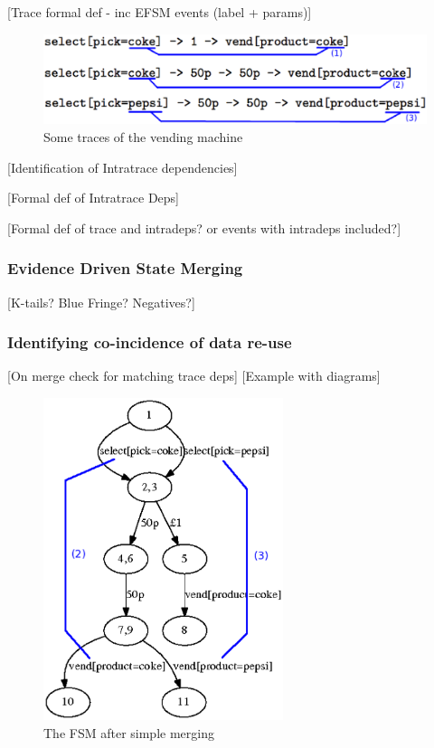 [Trace formal def - inc EFSM events (label + params)]

\begin{figure}[h]
\begin{center}
\includegraphics[width=12cm]{figures/efsm/intratracedeps.eps}
\caption{Some traces of the vending machine}
\label{fig:pta}
\end{center}
\end{figure}

[Identification of Intratrace dependencies]

[Formal def of Intratrace Deps]

[Formal def of trace and intradeps? or events with intradeps included?]

\subsubsection{Evidence Driven State Merging}
\label{EDSM}

[K-tails? Blue Fringe? Negatives?]

\subsubsection{Identifying co-incidence of data re-use}
\label{IntertraceDependencies}



[On merge check for matching trace deps]
[Example with diagrams]

\begin{figure}[h]
\begin{center}
\includegraphics[width=7cm]{figures/efsm/vend2-withannotations.eps}
\caption{The FSM after simple merging}
\label{fig:FSM}
\end{center}
\end{figure}


